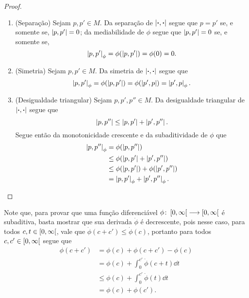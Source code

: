 \begin{proof}
	\begin{enumerate}
	\item (Separação) Sejam $p,p' \in M$. %
	Da separação de $\left\vert{\bm{\cdot}},{\bm{\cdot}}\right\vert$ segue que $p=p'$ se, e somente se, $\left\vert{p},{p'}\right\vert = 0$; da mediabilidade de $\phi$ segue que $\left\vert{p},{p'}\right\vert=0$ se, e somente se,
		\[
		\left\vert{p},{p'}\right\vert_\phi = \phi(\left\vert{p},{p'}\right\vert) = \phi (0) = 0.
		\]
	
	\item (Simetria) Sejam $p,p' \in M$. Da simetria de $\left\vert{\bm{\cdot}},{\bm{\cdot}}\right\vert$ segue que
		\[
		\left\vert{p},{p'}\right\vert_\phi = \phi(\left\vert{p},{p'}\right\vert) = \phi(\left\vert{p'},{p}\right\vert) = \left\vert{p'},{p}\right\vert_\phi.
		\]
	
	\item (Desigualdade triangular) Sejam $p,p',p'' \in M$. Da desigualdade triangular de $\left\vert{\bm{\cdot}},{\bm{\cdot}}\right\vert$ segue que
		\[
		\left\vert{p},{p''}\right\vert \leq \left\vert{p},{p'}\right\vert + \left\vert{p'},{p''}\right\vert.
		\]
	Segue então da monotonicidade crescente e da subaditividade de $\phi$ que
		\begin{align*}
		\left\vert{p},{p''}\right\vert_\phi &= \phi (\left\vert{p},{p''}\right\vert) \\
			&\leq \phi(\left\vert{p},{p'}\right\vert + \left\vert{p'},{p''}\right\vert) \\			
			&\leq \phi(\left\vert{p},{p'}\right\vert) + \phi(\left\vert{p'},{p''}\right\vert) \\
			&= \left\vert{p},{p'}\right\vert_\phi+ \left\vert{p'},{p''}\right\vert_\phi.
		\qedhere
		\end{align*}
	\end{enumerate}
\end{proof}

Note que, para provar que uma função diferenciável $\phi\colon \allowbreak \left[0,\allowbreak \infty\right[ \longrightarrow \left[0,\allowbreak \infty\right[$ é subaditiva, basta mostrar que sua derivada $\dot \phi$ é decrescente, pois nesse caso, para todos $c, t \in \left[0,\allowbreak \infty\right[$, vale que $\dot\phi(c+c') \leq \dot\phi(c)$, portanto para todos $c, c' \in \left[0,\allowbreak \infty\right[$ segue que
	\begin{align*}
	\phi(c+c') &= \phi(c) + \phi(c+c') - \phi(c) \\
		&= \phi(c) + \int_0^{c'} \dot\phi(c+t) \dd t \\
		&\leq \phi(c) + \int_0^{c'} \dot\phi(t) \dd t \\
		&= \phi(c) + \phi(c').
	\end{align*}

